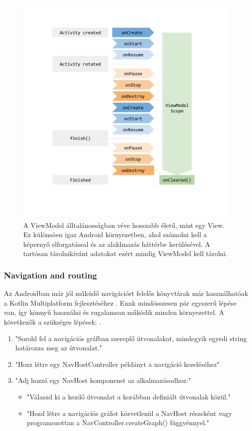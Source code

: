 \begin{figure}[!ht]
    \centering
    \includegraphics[width=150mm, keepaspectratio]{figures/viewmodel-lifecycle.png}
    \caption{A ViewModel álltalánosságban véve hosszabb életű, mint egy View. Ez különsöen igaz Android környezetben, ahol számolni kell a képernyő elforgatással és az alaklmazás háttérbe kerülésével. A tartósan tárolnikívánt adatokat ezért mindig ViewModel kell tárolni. \cite{ViewModelAndroid}}
    \label{fig:ViewModel}
\end{figure}

\subsubsection{Navigation and routing}

Az Androidban már jól műküdő navigációrt felelős könyvtárak már használhatóak a Kotlin Multiplatform fejlesztéséhez \cite{NavigationKMP}.
Ennk mindösszesen pár egyszerű lépése van, így könnyű használni és rugalamsan működik minden környezettel.
A következők a szükséges lépések: \cite{NavigationKMP}.
\begin{enumerate}
    \item "Sorold fel a navigációs gráfban szereplő útvonalakat, mindegyik egyedi string határozza meg az útvonalat."
    \item "Hozz létre egy NavHostController példányt a navigáció kezeléséhez"
    \item "Adj hozzá egy NavHost komponenst az alkalmazásodhoz:"
        \begin{itemize}
            \item "Válaszd ki a kezdő útvonalat a korábban definiált útvonalak közül."
            \item "Hozd létre a navigációs gráfot közvetlenül a NavHost részeként vagy programozottan a NavController.createGraph() függvénnyel."
        \end{itemize}
\end{enumerate}

